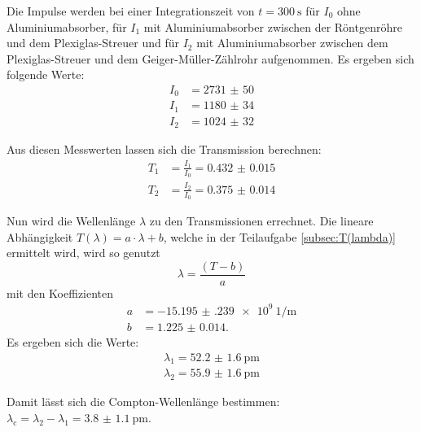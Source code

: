   Die Impulse werden bei einer Integrationszeit von $ t = \SI{300}{\second}$ für $I_0$ ohne Aluminiumabsorber, für $I_1$ mit Aluminiumabsorber zwischen der 
  Röntgenröhre und dem Plexiglas-Streuer und für $I_2$ mit Aluminiumabsorber zwischen dem Plexiglas-Streuer und dem Geiger-Müller-Zählrohr aufgenommen. 
  Es ergeben sich 
  folgende Werte:
  \begin{align*}
    I_0 &= \num{2731(50)}\\
    I_1 &= \num{1180(34)}\\
    I_2 &= \num{1024(32)}
  \end{align*}

  \noindent Aus diesen Messwerten lassen sich die Transmission berechnen:
  \begin{align*}
    T_1 &= \frac{I_1}{I_0} = \num{0.432(15)}\\
    T_2 &= \frac{I_2}{I_0} = \num{0.375(14)}
  \end{align*}

  \noindent Nun wird die Wellenlänge $\lambda$ zu den Transmissionen errechnet. Die lineare Abhängigkeit $T(\lambda) = a \cdot \lambda + b $, 
  welche in der Teilaufgabe \ref{subsec:T(lambda)} ermittelt wird, wird so genutzt
  \begin{equation*}
    \lambda = \frac{(T - b)}{a}
  \end{equation*}
  mit den Koeffizienten
  \begin{align*}
    a &= \SI{-15.195(239)e9}{1\per\metre}\\
    b &= \num{1.225(14)}.
  \end{align*}
  Es ergeben sich die Werte:
  \begin{align*}
    \lambda_1 = \SI{52.2(16)}{\pico\metre}\\
    \lambda_2 = \SI{55.9(16)}{\pico\metre}
  \end{align*}

  \noindent Damit lässt sich die Compton-Wellenlänge bestimmen: $\lambda_{\text{c}} = \lambda_2 - \lambda_1 = \SI{3.8(11)}{\pico\metre}$. 


